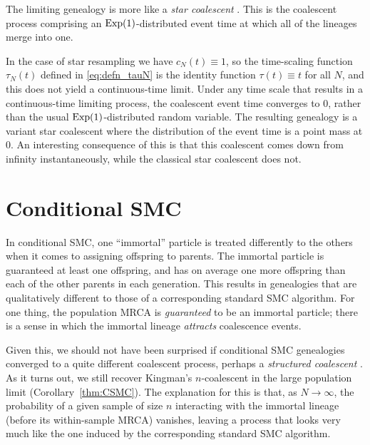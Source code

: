 The limiting genealogy is more like a \emph{star coalescent} \parencite{pitman1999, griffiths2016}. This is the coalescent process comprising an $\operatorname{Exp}(1)$-distributed event time at which all of the lineages merge into one.

In the case of star resampling we have $c_N(t) \equiv 1$, so the time-scaling function $\tau_N(t)$ defined in \eqref{eq:defn_tauN} is the identity function $\tau(t) \equiv t$ for all $N$, and this does not yield a continuous-time limit.
Under any time scale that results in a continuous-time limiting process, the coalescent event time converges to $0$, rather than the usual $\operatorname{Exp}(1)$-distributed random variable. The resulting genealogy is a variant star coalescent where the distribution of the event time is a point mass at $0$. An interesting consequence of this is that this coalescent comes down from infinity instantaneously, while the classical star coalescent does not.





\section{Conditional SMC}
In conditional SMC, one ``immortal'' particle is treated differently to the others when it comes to assigning offspring to parents. The immortal particle is guaranteed at least one offspring, and has on average one more offspring than each of the other parents in each generation.
This results in genealogies that are qualitatively different to those of a corresponding standard SMC algorithm. For one thing, the population MRCA is \emph{guaranteed} to be an immortal particle; there is a sense in which the immortal lineage \emph{attracts} coalescence events.

Given this, we should not have been surprised if conditional SMC genealogies converged to a quite different coalescent process, perhaps a \emph{structured coalescent} \parencite{notohara1990}.
As it turns out, we still recover Kingman's $n$-coalescent in the large population limit (Corollary~\ref{thm:CSMC}). 
The explanation for this is that, as $N\to\infty$, the probability of a given sample of size $n$ interacting with the immortal lineage (before its within-sample MRCA) vanishes, leaving a process that looks very much like the one induced by the corresponding standard SMC algorithm.

